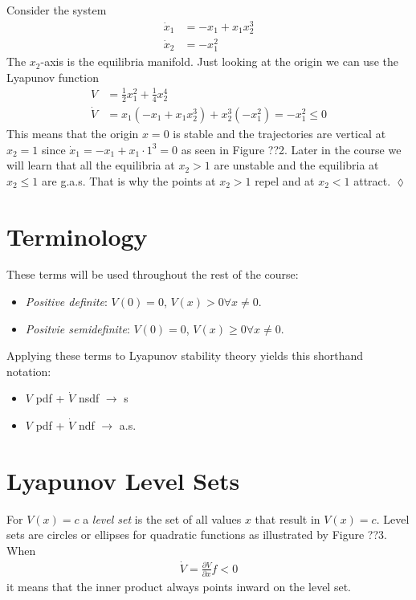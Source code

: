 \begin{example}
Consider the system
\begin{align}
\label{eq:lec08ex3}
\dot{x}_1 &= -x_1 + x_1x_2^3 \\
\label{eq:lec08ex4}
\dot{x}_2 &= -x_1^2
\end{align}
The $x_2$-axis is the equilibria manifold. Just looking at the origin we can use the Lyapunov function
\begin{align*}
V &= \tfrac{1}{2}x_1^2 + \tfrac{1}{4}x_2^4 \\
\dot{V} &= x_1(-x_1+x_1x_2^3) + x_2^3(-x_1^2) = -x_1^2 \leq 0
\end{align*}
This means that the origin $x=0$ is stable and the trajectories  are vertical at $x_2=1$ since $\dot{x}_1=-x_1+x_1\cdot 1^3 = 0$ as seen in Figure ??2. Later in the course we will learn that all the equilibria at $x_2>1$ are unstable and the equilibria at $x_2\leq1$ are g.a.s. That is why the points at $x_2>1$ repel and at $x_2<1$ attract.
$\lozenge$
\end{example}

\section{Terminology}
These terms will be used throughout the rest of the course:
\begin{itemize}
\item \textit{Positive definite}: $V(0)=0$, $V(x)>0\forall x \neq0$.
\item \textit{Positvie semidefinite}: $V(0)=0$, $V(x)\geq0 \forall x \neq0$.
\end{itemize}

Applying these terms to Lyapunov stability theory yields this shorthand notation:
\begin{itemize}
\item $V$ pdf + $\dot{V}$ nsdf $\to$ s
\item $V$ pdf + $\dot{V}$ ndf $\to$ a.s.
\end{itemize}

\section{Lyapunov Level Sets}
For $V(x)=c$ a \textit{level set} is the set of all values $x$ that result in $V(x)=c$. Level sets are circles or ellipses for quadratic functions as illustrated by Figure ??3. When
\begin{align*}
\dot{V} = \frac{\partial V}{\partial x}f<0
\end{align*}
it means that the inner product always points inward on the level set.

